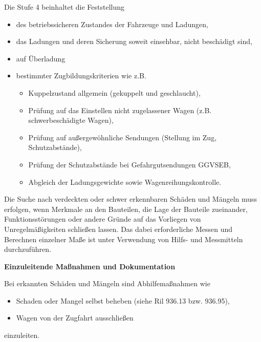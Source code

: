Die Stufe 4 beinhaltet die Feststellung
\begin{itemize}
    \item des betriebssicheren Zustandes der Fahrzeuge und Ladungen,
    \item das Ladungen und deren Sicherung soweit einsehbar, nicht beschädigt sind,
    \item auf Überladung
    \item bestimmter Zugbildungskriterien wie z.B.
    \begin{itemize}
        \item Kuppelzustand allgemein (gekuppelt und geschlaucht),
        \item Prüfung auf das Einstellen nicht zugelassener Wagen (z.B. schwerbeschädigte Wagen),
        \item Prüfung auf außergewöhnliche Sendungen (Stellung im Zug, Schutzabstände),
        \item Prüfung der Schutzabstände bei Gefahrgutsendungen GGVSEB,
        \item Abgleich der Ladungsgewichte sowie Wagenreihungskontrolle.
    \end{itemize}
\end{itemize}
Die Suche nach verdeckten oder schwer erkennbaren Schäden und Mängeln muss erfolgen, wenn Merkmale an den Bauteilen, die Lage der Bauteile zueinander, Funktionsstörungen oder andere Gründe auf das Vorliegen von Unregelmäßigkeiten schließen lassen. Das dabei erforderliche Messen und Berechnen einzelner Maße ist unter Verwendung von Hilfs- und Messmitteln durchzuführen.\par
\textbf{Einzuleitende Maßnahmen und Dokumentation} \par
Bei erkannten Schäden und Mängeln sind Abhilfemaßnahmen wie
\begin{itemize}
    \item Schaden oder Mangel selbst beheben (siehe Ril 936.13 bzw. 936.95),
    \item Wagen von der Zugfahrt ausschließen
\end{itemize}
einzuleiten.



